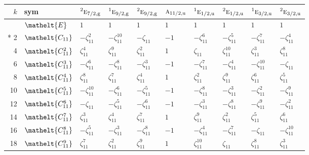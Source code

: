 \documentclass[10pt,a4paper]{article}
\numberwithin{equation}{section}
\newcommand{\eltfont}[1]{{\let\sigma\eltsigma\mathelt{#1}}}
\newcommand{\irr}[1]{\text{\normalfont\scshape #1}}
\newcommand{\conjpair}[1]{{}^{#1}}
\newcommand{\cls}[1]{\eltfont{#1}}
\newcommand{\ptag}[1]{\mathrm{#1}}
\newcommand{\rootunity}[1]{\zeta_{#1}}
\begin{document}
{\small\setlength{\tabcolsep}{4pt}
\begin{longtable}{@{}rlllllllll@{}}\toprule
$k$ & sym & $\conjpair{2}\irr{e}_{7/2,\ptag{g}}$ & $\conjpair{1}\irr{e}_{9/2,\ptag{g}}$ & $\conjpair{2}\irr{e}_{9/2,\ptag{g}}$ & $\irr{a}_{11/2,\ptag{u}}$ & $\conjpair{1}\irr{e}_{1/2,\ptag{u}}$ & $\conjpair{2}\irr{e}_{1/2,\ptag{u}}$ & $\conjpair{1}\irr{e}_{3/2,\ptag{u}}$ & $\conjpair{2}\irr{e}_{3/2,\ptag{u}}$\\\midrule\endhead
\bottomrule\endfoot\endlastfoot
0 & $\cls{E}$ & $1$ & $1$ & $1$ & $1$ & $1$ & $1$ & $1$ & $1$\\*
2 & $\cls{C_{11}}$ & $-\rootunity{11}^{2}$ & $-\rootunity{11}^{10}$ & $-\rootunity{11}$ & $-1$ & $-\rootunity{11}^{6}$ & $-\rootunity{11}^{5}$ & $-\rootunity{11}^{7}$ & $-\rootunity{11}^{4}$\\
4 & $\cls{C_{11}^{2}}$ & $\rootunity{11}^{4}$ & $\rootunity{11}^{9}$ & $\rootunity{11}^{2}$ & $1$ & $\rootunity{11}$ & $\rootunity{11}^{10}$ & $\rootunity{11}^{3}$ & $\rootunity{11}^{8}$\\
6 & $\cls{C_{11}^{3}}$ & $-\rootunity{11}^{6}$ & $-\rootunity{11}^{8}$ & $-\rootunity{11}^{3}$ & $-1$ & $-\rootunity{11}^{7}$ & $-\rootunity{11}^{4}$ & $-\rootunity{11}^{10}$ & $-\rootunity{11}$\\
8 & $\cls{C_{11}^{4}}$ & $\rootunity{11}^{8}$ & $\rootunity{11}^{7}$ & $\rootunity{11}^{4}$ & $1$ & $\rootunity{11}^{2}$ & $\rootunity{11}^{9}$ & $\rootunity{11}^{6}$ & $\rootunity{11}^{5}$\\
10 & $\cls{C_{11}^{5}}$ & $-\rootunity{11}^{10}$ & $-\rootunity{11}^{6}$ & $-\rootunity{11}^{5}$ & $-1$ & $-\rootunity{11}^{8}$ & $-\rootunity{11}^{3}$ & $-\rootunity{11}^{2}$ & $-\rootunity{11}^{9}$\\
12 & $\cls{C_{11}^{6}}$ & $-\rootunity{11}$ & $-\rootunity{11}^{5}$ & $-\rootunity{11}^{6}$ & $-1$ & $-\rootunity{11}^{3}$ & $-\rootunity{11}^{8}$ & $-\rootunity{11}^{9}$ & $-\rootunity{11}^{2}$\\
14 & $\cls{C_{11}^{7}}$ & $\rootunity{11}^{3}$ & $\rootunity{11}^{4}$ & $\rootunity{11}^{7}$ & $1$ & $\rootunity{11}^{9}$ & $\rootunity{11}^{2}$ & $\rootunity{11}^{5}$ & $\rootunity{11}^{6}$\\
16 & $\cls{C_{11}^{8}}$ & $-\rootunity{11}^{5}$ & $-\rootunity{11}^{3}$ & $-\rootunity{11}^{8}$ & $-1$ & $-\rootunity{11}^{4}$ & $-\rootunity{11}^{7}$ & $-\rootunity{11}$ & $-\rootunity{11}^{10}$\\
18 & $\cls{C_{11}^{9}}$ & $\rootunity{11}^{7}$ & $\rootunity{11}^{2}$ & $\rootunity{11}^{9}$ & $1$ & $\rootunity{11}^{10}$ & $\rootunity{11}$ & $\rootunity{11}^{8}$ & $\rootunity{11}^{3}$\\

\end{longtable}}
\end{document}
